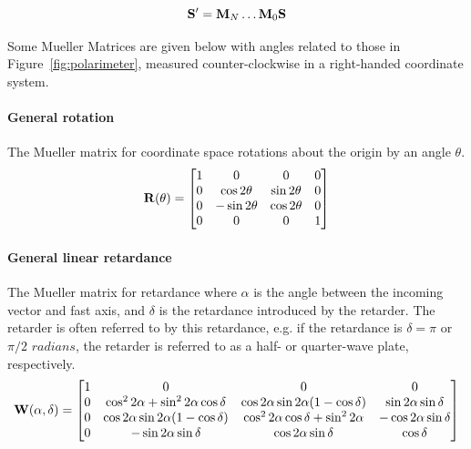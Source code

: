 \begin{equation}
    \mathbf{S}^{\prime} = \mathbf{M}_{N} \dots \mathbf{M}_{0} \mathbf{S}
    \label{eq:mueller_train}
\end{equation}

Some Mueller Matrices are given below with angles related to those in Figure~\ref{fig:polarimeter}, measured counter-clockwise in a right-handed coordinate system.

\paragraph*{General rotation}
The Mueller matrix for coordinate space rotations about the origin by an angle $\theta$.
\begin{equation}
    \mathbf{R}(\theta) = 
    \begin{bmatrix}
        1 &  0             & 0             & 0 \\
        0 &  \cos 2 \theta & \sin 2 \theta & 0 \\
        0 & -\sin 2 \theta & \cos 2 \theta & 0 \\
        0 &  0             & 0             & 1 \\
    \end{bmatrix}
    \label{matrix:rotate}
\end{equation}

\paragraph*{General linear retardance}
The Mueller matrix for retardance where $\alpha$ is the angle between the incoming vector and fast axis, and $\delta$ is the retardance introduced by the retarder. The retarder is often referred to by this retardance, e.g. if the retardance is $\delta = \pi$ or $\pi / 2$ $radians$, the retarder is referred to as a half- or quarter-wave plate, respectively.
\begin{equation}
    \mathbf{W}(\alpha, \delta) = 
    \begin{bmatrix}
        1 & 0               & 0               & 0 \\
        0 & \cos^{2} 2 \alpha + \sin^{2} 2 \alpha \cos \delta & \cos 2 \alpha \sin 2 \alpha  (1 - \cos \delta) & \sin 2 \alpha \sin \delta \\
        0 & \cos 2 \alpha \sin 2 \alpha  (1 - \cos \delta) & \cos^{2} 2 \alpha \cos \delta + \sin^{2} 2 \alpha & -\cos 2 \alpha \sin \delta \\
        0 & -\sin 2 \alpha \sin \delta& \cos 2 \alpha \sin \delta & \cos \delta \\
    \end{bmatrix}
    \label{matrix:retarder}
\end{equation}

